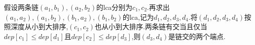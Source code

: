 假设两条链$(a_1, b_1), (a_2, b_2)$的lca分别为$c_1, c_2$.再求出$(a_1, a_2), (a_1, b_2), (b_1, a_2), (b_1, b_2)$的lca,记为$d_1, d_2, d_3, d_4$.将$(d_1, d_2, d_3, d_4)$按照深度从小到大排序,$(c_1,c_2)$也从小到大排序.两条链有交当且仅当$dep[c_1] \leq dep[d_1]$且$dep[c_2] \leq dep[d_3]$,则$(d_3, d_4)$是链交的两个端点.\\ \\ \\ \\
